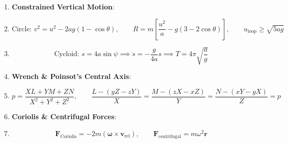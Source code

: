 \begin{keybox}
\begin{enumerate}[leftmargin=1.5em, start=10]
    \item \textbf{Constrained Vertical Motion}:
    \item \[ \text{Circle: } v^2 = u^2 - 2ag(1-\cos\theta), \qquad R = m\left[\frac{u^2}{a} - g(3-2\cos\theta)\right], \qquad u_{\text{loop}} \ge \sqrt{5ag} \]
    \item \[ \text{Cycloid: } s = 4a\sin\psi \implies \ddot{s} = -\frac{g}{4a}s \implies T = 4\pi\sqrt{\frac{a}{g}} \]
    
    \item \textbf{Wrench \& Poinsot's Central Axis}:
    \item \[ p = \frac{XL + YM + ZN}{X^2 + Y^2 + Z^2}, \qquad \frac{L - (yZ - zY)}{X} = \frac{M - (zX - xZ)}{Y} = \frac{N - (xY - yX)}{Z} = p \]
    
    \item \textbf{Coriolis \& Centrifugal Forces}:
    \item \[ \mathbf{F}_{\text{Coriolis}} = -2m(\boldsymbol{\omega} \times \mathbf{v}_{\text{rel}}), \qquad \mathbf{F}_{\text{centrifugal}} = m\omega^2 \mathbf{r} \]
\end{enumerate}
\end{keybox}
